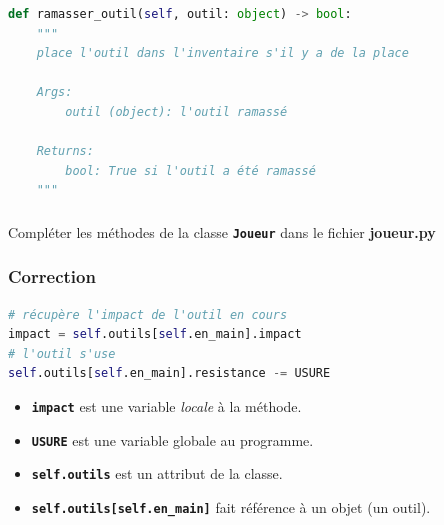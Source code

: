\documentclass[svgnames,11pt]{beamer}
\begin{document}
\begin{frame}[fragile]
    \frametitle{}

    \begin{center}
    \begin{lstlisting}[language=Python , basicstyle=\small, xleftmargin=2em, xrightmargin=2em]
def ramasser_outil(self, outil: object) -> bool:
    """
    place l'outil dans l'inventaire s'il y a de la place

    Args:
        outil (object): l'outil ramassé

    Returns:
        bool: True si l'outil a été ramassé
    """
\end{lstlisting}
    \label{CODE}
    \end{center}

\end{frame}
\begin{frame}
    \frametitle{}

    \begin{activite}
    Compléter les méthodes de la classe \textbf{\texttt{Joueur}} dans le fichier \textbf{joueur.py}
    \end{activite}

\end{frame}
\begin{frame}[fragile]
    \frametitle{Correction}

    \begin{center}
    \begin{lstlisting}[language=Python , basicstyle=\small, xleftmargin=2em, xrightmargin=2em]
# récupère l'impact de l'outil en cours
impact = self.outils[self.en_main].impact
# l'outil s'use
self.outils[self.en_main].resistance -= USURE
\end{lstlisting}
    \label{CODE}
    \end{center}
\begin{itemize}
    \item \textbf{\texttt{impact}} est une variable \emph{locale} à la méthode.
    \item \textbf{\texttt{USURE}} est une variable globale au programme.
    \item \textbf{\texttt{self.outils}} est un attribut de la classe.
    \item \textbf{\texttt{self.outils[self.en\_main]}} fait référence à un objet (un outil).
\end{itemize}
\end{frame}
\end{document}
